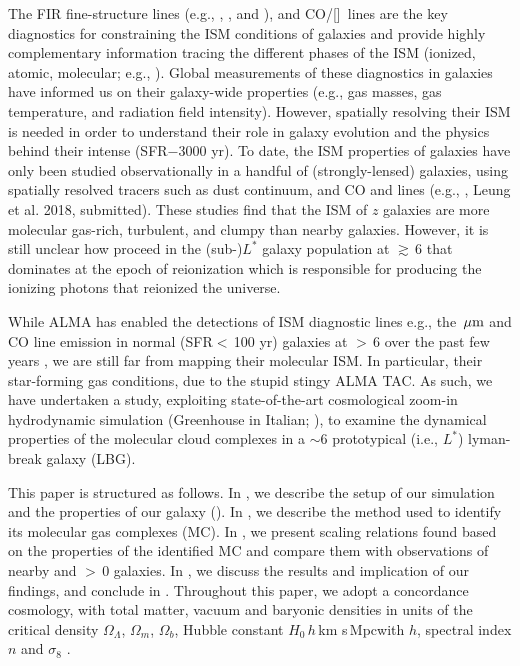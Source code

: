 \documentclass[apj]{emulateapj} %
\begin{document}
The FIR fine-structure lines (e.g., \cii, \nii, and \oiii), and CO/[\ci]~lines are the key diagnostics for 
constraining the ISM conditions of galaxies and
provide highly complementary information tracing the different phases of the ISM (ionized, 
atomic, molecular; e.g., \citealt{Scoville74a, Rubin85a, Malhotra01a}).
Global measurements of these diagnostics in \highz galaxies 
have informed us on their galaxy-wide properties (e.g., 
gas masses, gas temperature, and radiation field intensity).
However, spatially resolving their ISM is needed in order to understand their role in galaxy evolution and 
the physics behind their intense \SF (SFR$-$3000\,\Msun\,yr\pmOne).
To date, the ISM properties of \highz galaxies 
have only been studied observationally in a handful of (strongly-lensed) 
galaxies, using spatially resolved tracers such as 
dust continuum, and CO and \cii lines (e.g., \citealt{Swinbank11a, Hodge15a, Ferkinhoff15a, Hodge16a},
Leung et al. 2018, submitted).
These studies find that the ISM of $z$ galaxies are more 
molecular gas-rich, turbulent, and clumpy than nearby galaxies.
However, it is still unclear how \SF proceed in the (sub-)$L^*$ galaxy population at \z$\gtrsim$\,6 
that dominates  \SF at the epoch of reionization which is responsible for producing the 
ionizing photons that reionized the universe.

While ALMA has enabled the detections of 
ISM diagnostic lines e.g., the \,$\mbox{$\mu$m}$ and CO line emission in 
normal (SFR$<$\,100\,\Msun\,yr\pmOne) galaxies at \z$>$\,6 over the past few years \citep[e.g.,][]{Smit18a},
we are still far from mapping their molecular ISM.
In particular, their star-forming gas conditions, due to the stupid stingy ALMA TAC.
As such, we have undertaken a study, exploiting 
state-of-the-art cosmological zoom-in hydrodynamic simulation 
 (Greenhouse in Italian; \citealt{Pallottini17a, Pallottini17b}), to examine 
the dynamical properties of the molecular cloud complexes in a \z$\sim$6 prototypical (i.e., $L^*$) lyman-break
galaxy (LBG).

This paper is structured as follows.
In , we describe the setup of our simulation and the properties of our galaxy (\flower).
In , we describe the method used to identify its molecular gas complexes (MC). 
In , we present scaling relations found based on the properties of 
the identified MC and compare them with observations of nearby and \z$>$\,0 galaxies.
In , we discuss the results and implication of our findings,
and conclude in .
Throughout this paper, we adopt a concordance cosmology, with total matter, vacuum and baryonic densities 
in units of the critical density $\Omega_{\Lambda}$, $\Omega_m$, $\Omega_b$, 
Hubble constant $H_0$\,$h$\,km s\pmOne\,Mpc\pmOne with $h$, 
spectral index $n$ and $\sigma_8$ \citep{Planck14a}.
\end{document}
